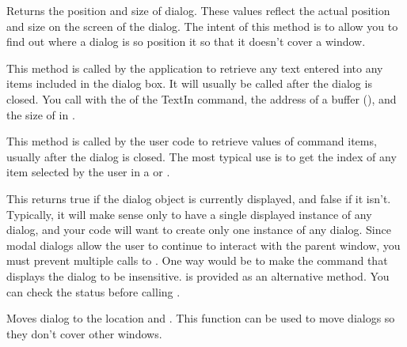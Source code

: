 Returns the position and size of  dialog. These values
reflect the actual position and size on the screen of the dialog.
The intent of this method
is to allow you to find out where a dialog is so
position it so that it
doesn't cover a window.


This method is called by the application to retrieve any text
entered into any  items included in the dialog
box. It will usually be called after the dialog is closed.
You call  with the  of the TextIn
command, the address of a buffer (), and the
size of  in .


This method is called by the user code to retrieve values of
command items, usually after the dialog is closed.  The most
typical use is to get the index of any item selected by the
user in a  or .


This returns true if the dialog object is currently displayed,
and false if it isn't. Typically, it will make sense only to
have a single displayed instance of any dialog, and your code
will want to create only one instance of any dialog. Since
modal dialogs allow the user to continue to interact with the
parent window, you must prevent multiple calls to .
One way would be to make the command that displays the dialog to
be insensitive.  is provided as an alternative
method. You can check the  status before
calling .


Moves  dialog to the location  and
. This function can be used to move dialogs so
they don't cover other windows.


